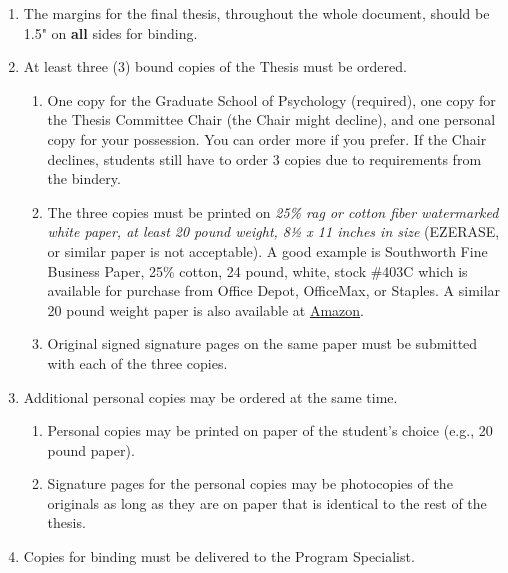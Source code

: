 \documentclass[openany]{book}
\providecommand{\tightlist}{%
  \setlength{\itemsep}{0pt}\setlength{\parskip}{0pt}}
\begin{document}
\begin{enumerate}
\def\labelenumi{\arabic{enumi}.}
\item
  The margins for the final thesis, throughout the whole document, should be 1.5" on \textbf{all} sides for binding.
\item
  At least three (3) bound copies of the Thesis must be ordered.

  \begin{enumerate}
  \def\labelenumii{\alph{enumii}.}
  \tightlist
  \item
    One copy for the Graduate School of Psychology (required), one copy for the Thesis Committee Chair (the Chair might decline), and one personal copy for your possession. You can order more if you prefer. If the Chair declines, students still have to order 3 copies due to requirements from the bindery.
  \item
    The three copies must be printed on \emph{25\% rag or cotton fiber watermarked white paper, at least 20 pound weight, 8½ x 11 inches in size} (EZERASE, or similar paper is not acceptable). A good example is Southworth Fine Business Paper, 25\% cotton, 24 pound, white, stock \#403C which is available for purchase from Office Depot, OfficeMax, or Staples. A similar 20 pound weight paper is also available at \href{https://www.amazon.com/Southworth-Business-Cotton-Sheets-403C/dp/B00006IE2G/ref=sr_1_1?dchild=1\&keywords=southworth+fine+business+paper+\%23403c\&qid=1590377859\&sr=8-1}{Amazon}.
  \item
    Original signed signature pages on the same paper must be submitted with each of the three copies.
  \end{enumerate}
\item
  Additional personal copies may be ordered at the same time.

  \begin{enumerate}
  \def\labelenumii{\alph{enumii}.}
  \tightlist
  \item
    Personal copies may be printed on paper of the student's choice (e.g., 20 pound paper).
  \item
    Signature pages for the personal copies may be photocopies of the originals as long as they are on paper that is identical to the rest of the thesis.
  \end{enumerate}
\item
  Copies for binding must be delivered to the Program Specialist.


\end{enumerate}
\end{document}
